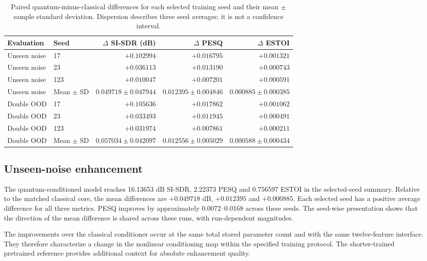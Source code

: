 \documentclass[10pt,a4paper]{article}
\begin{document}
\begin{table}[H]
\centering\small
\caption{Paired quantum-minus-classical differences for each selected training seed and their mean $\pm$ sample standard deviation. Dispersion describes three seed averages; it is not a confidence interval.}
\label{tab:paired}
\begin{tabular}{llrrr}
\toprule
Evaluation & Seed & $\Delta$ SI-SDR (dB) & $\Delta$ PESQ & $\Delta$ ESTOI\\
\midrule
Unseen noise & 17 & $+0.102994$ & $+0.016795$ & $+0.001321$ \\
Unseen noise & 23 & $+0.036113$ & $+0.013190$ & $+0.000743$ \\
Unseen noise & 123 & $+0.010047$ & $+0.007201$ & $+0.000591$ \\
Unseen noise & Mean $\pm$ SD & $0.049718 \pm 0.047944$ & $0.012395 \pm 0.004846$ & $0.000885 \pm 0.000385$ \\
\midrule
Double OOD & 17 & $+0.105636$ & $+0.017862$ & $+0.001062$ \\
Double OOD & 23 & $+0.033493$ & $+0.011945$ & $+0.000491$ \\
Double OOD & 123 & $+0.031974$ & $+0.007861$ & $+0.000211$ \\
Double OOD & Mean $\pm$ SD & $0.057034 \pm 0.042097$ & $0.012556 \pm 0.005029$ & $0.000588 \pm 0.000434$ \\
\bottomrule
\end{tabular}
\end{table}


\subsection{Unseen-noise enhancement}
The quantum-conditioned model reaches 16.13653 dB SI-SDR, 2.22373 PESQ and 0.756597 ESTOI in the selected-seed summary. Relative to the matched classical core, the mean differences are $+0.049718$ dB, $+0.012395$ and $+0.000885$. Each selected seed has a positive average difference for all three metrics. PESQ improves by approximately 0.0072--0.0168 across these seeds. The seed-wise presentation shows that the direction of the mean difference is shared across these runs, with run-dependent magnitudes.

The improvements over the classical conditioner occur at the same total stored parameter count and with the same twelve-feature interface. They therefore characterize a change in the nonlinear conditioning map within the specified training protocol. The shorter-trained pretrained reference provides additional context for absolute enhancement quality.
\end{document}
